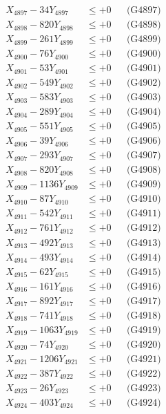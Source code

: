 \documentclass[a4paper,10pt]{article}
\begin{document}
{\begin{align}
X_{4897} - 34Y_{4897} &\leq +0 && \text{(G4897)} \\
X_{4898} - 820Y_{4898} &\leq +0 && \text{(G4898)} \\
X_{4899} - 261Y_{4899} &\leq +0 && \text{(G4899)} \\
X_{4900} - 76Y_{4900} &\leq +0 && \text{(G4900)} \\
\allowbreak
X_{4901} - 53Y_{4901} &\leq +0 && \text{(G4901)} \\
X_{4902} - 549Y_{4902} &\leq +0 && \text{(G4902)} \\
X_{4903} - 583Y_{4903} &\leq +0 && \text{(G4903)} \\
X_{4904} - 289Y_{4904} &\leq +0 && \text{(G4904)} \\
X_{4905} - 551Y_{4905} &\leq +0 && \text{(G4905)} \\
X_{4906} - 39Y_{4906} &\leq +0 && \text{(G4906)} \\
X_{4907} - 293Y_{4907} &\leq +0 && \text{(G4907)} \\
X_{4908} - 820Y_{4908} &\leq +0 && \text{(G4908)} \\
X_{4909} - 1136Y_{4909} &\leq +0 && \text{(G4909)} \\
X_{4910} - 87Y_{4910} &\leq +0 && \text{(G4910)} \\
\allowbreak
X_{4911} - 542Y_{4911} &\leq +0 && \text{(G4911)} \\
X_{4912} - 761Y_{4912} &\leq +0 && \text{(G4912)} \\
X_{4913} - 492Y_{4913} &\leq +0 && \text{(G4913)} \\
X_{4914} - 493Y_{4914} &\leq +0 && \text{(G4914)} \\
X_{4915} - 62Y_{4915} &\leq +0 && \text{(G4915)} \\
X_{4916} - 161Y_{4916} &\leq +0 && \text{(G4916)} \\
X_{4917} - 892Y_{4917} &\leq +0 && \text{(G4917)} \\
X_{4918} - 741Y_{4918} &\leq +0 && \text{(G4918)} \\
X_{4919} - 1063Y_{4919} &\leq +0 && \text{(G4919)} \\
X_{4920} - 74Y_{4920} &\leq +0 && \text{(G4920)} \\
\allowbreak
X_{4921} - 1206Y_{4921} &\leq +0 && \text{(G4921)} \\
X_{4922} - 387Y_{4922} &\leq +0 && \text{(G4922)} \\
X_{4923} - 26Y_{4923} &\leq +0 && \text{(G4923)} \\
X_{4924} - 403Y_{4924} &\leq +0 && \text{(G4924)} \\

\end{align}}
\end{document}

